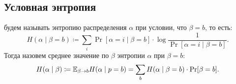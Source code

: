 \subsection{Условная энтропия}
\begin{defn}
	 будем называть энтропию распределения $  \alpha $ при условии, что $ \beta  = b$, то есть:
	\[
	H( \alpha \mid \beta  = b) \coloneqq  \sum_{i}^{} \Pr[ \alpha = i \mid  \beta  = b] \cdot  \log \frac{1}{\Pr [ \alpha  = i \mid \beta  = b]}
.\]
Тогда  назовем среднее значение по $ \beta$ энтропии $  \alpha $ при $ \beta = b$:
\[
	H( \alpha  \mid \beta ) \coloneqq  \mathbb{E}_{\beta \to b } H( \alpha  \mid p = b)  = \sum_{b} H ( \alpha  \mid \beta = b) \cdot  \Pr[\beta = b]
.\] 
\end{defn}
